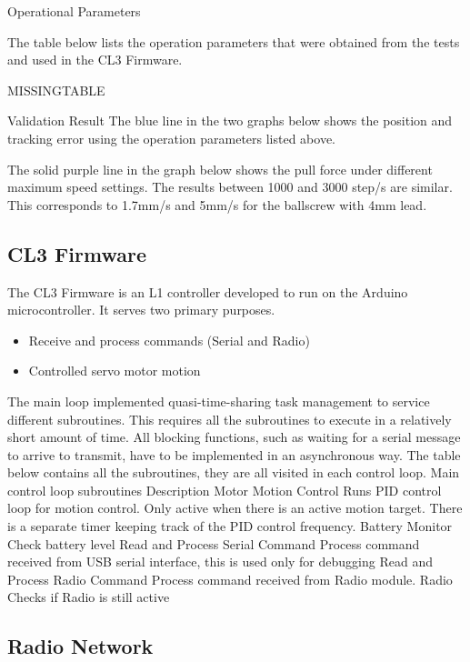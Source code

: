 Operational Parameters

The table below lists the operation parameters that were obtained from the tests and used in the CL3 Firmware.

MISSINGTABLE

Validation Result
The blue line in the two graphs below shows the position and tracking error using the operation parameters listed above.

The solid purple line in the graph below shows the pull force under different maximum speed settings. The results between 1000 and 3000 step/s are similar. This corresponds to 1.7mm/s and 5mm/s for the ballscrew with 4mm lead.

\subsection{CL3 Firmware}
\label{subsection:exploration_2_cl3_firmware}

The CL3 Firmware is an L1 controller developed to run on the Arduino microcontroller. It serves two primary purposes.

\begin{itemize}
    \item Receive and process commands (Serial and Radio)
    \item Controlled servo motor motion
\end{itemize}

The main loop implemented quasi-time-sharing task management to service different subroutines. This requires all the subroutines to execute in a relatively short amount of time. All blocking functions, such as waiting for a serial message to arrive to transmit, have to be implemented in an asynchronous way. The table below contains all the subroutines, they are all visited in each control loop.
Main control loop subroutines
Description
Motor Motion Control
Runs PID control loop for motion control. Only active when there is an active motion target. There is a separate timer keeping track of the PID control frequency.
Battery Monitor
Check battery level
Read and Process Serial Command 
Process command received from USB serial interface, this is used only for debugging
Read and Process Radio Command 
Process command received from Radio module. 
Radio
Checks if Radio is still active


\subsection{Radio Network}
\label{subsection:exploration_2_radio_network}

